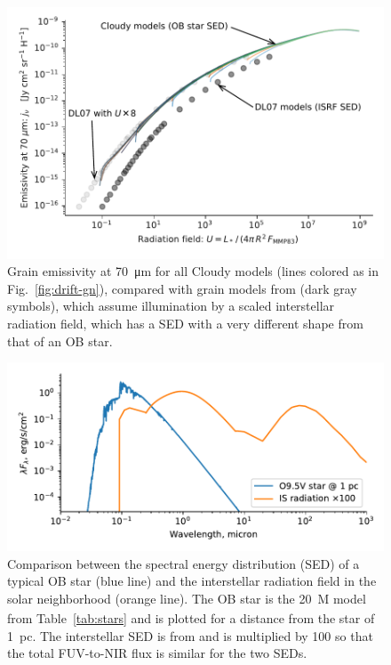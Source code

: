 \begin{figure}
  \centering
  \includegraphics[width=\linewidth]{figs/grain-j70-vs-U-edited}
  \caption{Grain emissivity at \SI{70}{\um} for all Cloudy models
    (lines colored as in Fig.~\ref{fig:drift-gn}), compared with grain
    models from \citet{Draine:2007a} (dark gray symbols), which assume
    illumination by a scaled interstellar radiation field, which has a
    SED with a very different shape from that of an OB star.  }
  \label{fig:grain-j70}
\end{figure}

\begin{figure}
  \centering
  \includegraphics[width=\linewidth]{figs/sed-comparison}
  \caption{Comparison between the spectral energy distribution (SED)
    of a typical OB star (blue line) and the interstellar radiation
    field in the solar neighborhood (orange line).  The OB star is the
    \SI{20}{M_\odot} model from Table~\ref{tab:stars} and is plotted for a
    distance from the star of \SI{1}{pc}.  The interstellar SED is
    from \citet{Mathis:1983a} and is multiplied by \num{100} so that
    the total FUV-to-NIR flux is similar for the two SEDs.}
  \label{fig:sed-comparison}
\end{figure}



